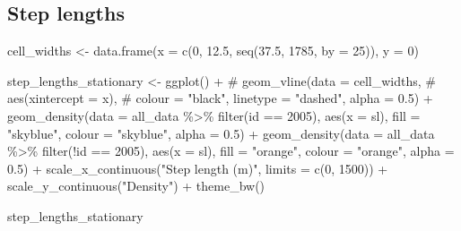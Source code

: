 \documentclass[
  letterpaper,
  DIV=11,
  numbers=noendperiod]{scrartcl}
\newenvironment{Shaded}{\begin{snugshade}}{\end{snugshade}}
\newcommand{\AttributeTok}[1]{\textcolor[rgb]{0.40,0.45,0.13}{#1}}
\newcommand{\CommentTok}[1]{\textcolor[rgb]{0.37,0.37,0.37}{#1}}
\newcommand{\DecValTok}[1]{\textcolor[rgb]{0.68,0.00,0.00}{#1}}
\newcommand{\FloatTok}[1]{\textcolor[rgb]{0.68,0.00,0.00}{#1}}
\newcommand{\FunctionTok}[1]{\textcolor[rgb]{0.28,0.35,0.67}{#1}}
\newcommand{\NormalTok}[1]{\textcolor[rgb]{0.00,0.23,0.31}{#1}}
\newcommand{\OtherTok}[1]{\textcolor[rgb]{0.00,0.23,0.31}{#1}}
\newcommand{\SpecialCharTok}[1]{\textcolor[rgb]{0.37,0.37,0.37}{#1}}
\newcommand{\StringTok}[1]{\textcolor[rgb]{0.13,0.47,0.30}{#1}}
\begin{document}
\subsection{Step lengths}\label{step-lengths}

\begin{Shaded}
\begin{Highlighting}[]
\NormalTok{cell\_widths }\OtherTok{\textless{}{-}} \FunctionTok{data.frame}\NormalTok{(}\AttributeTok{x =} \FunctionTok{c}\NormalTok{(}\DecValTok{0}\NormalTok{, }\FloatTok{12.5}\NormalTok{, }\FunctionTok{seq}\NormalTok{(}\FloatTok{37.5}\NormalTok{, }\DecValTok{1785}\NormalTok{, }\AttributeTok{by =} \DecValTok{25}\NormalTok{)), }\AttributeTok{y =} \DecValTok{0}\NormalTok{)}

\NormalTok{step\_lengths\_stationary }\OtherTok{\textless{}{-}} \FunctionTok{ggplot}\NormalTok{() }\SpecialCharTok{+}
  \CommentTok{\# geom\_vline(data = cell\_widths,}
  \CommentTok{\#            aes(xintercept = x), }
  \CommentTok{\#            colour = "black", linetype = "dashed", alpha = 0.5) +}
  \FunctionTok{geom\_density}\NormalTok{(}\AttributeTok{data =}\NormalTok{ all\_data }\SpecialCharTok{\%\textgreater{}\%} \FunctionTok{filter}\NormalTok{(id }\SpecialCharTok{==} \DecValTok{2005}\NormalTok{),}
                 \FunctionTok{aes}\NormalTok{(}\AttributeTok{x =}\NormalTok{ sl),}
                 \AttributeTok{fill =} \StringTok{"skyblue"}\NormalTok{, }\AttributeTok{colour =} \StringTok{"skyblue"}\NormalTok{, }\AttributeTok{alpha =} \FloatTok{0.5}\NormalTok{) }\SpecialCharTok{+}
  \FunctionTok{geom\_density}\NormalTok{(}\AttributeTok{data =}\NormalTok{ all\_data }\SpecialCharTok{\%\textgreater{}\%} \FunctionTok{filter}\NormalTok{(}\SpecialCharTok{!}\NormalTok{id }\SpecialCharTok{==} \DecValTok{2005}\NormalTok{),}
                 \FunctionTok{aes}\NormalTok{(}\AttributeTok{x =}\NormalTok{ sl),}
                 \AttributeTok{fill =} \StringTok{"orange"}\NormalTok{, }\AttributeTok{colour =} \StringTok{"orange"}\NormalTok{, }\AttributeTok{alpha =} \FloatTok{0.5}\NormalTok{) }\SpecialCharTok{+}
  \FunctionTok{scale\_x\_continuous}\NormalTok{(}\StringTok{"Step length (m)"}\NormalTok{, }\AttributeTok{limits =} \FunctionTok{c}\NormalTok{(}\DecValTok{0}\NormalTok{, }\DecValTok{1500}\NormalTok{)) }\SpecialCharTok{+}
  \FunctionTok{scale\_y\_continuous}\NormalTok{(}\StringTok{"Density"}\NormalTok{) }\SpecialCharTok{+}
  \FunctionTok{theme\_bw}\NormalTok{()}

\NormalTok{step\_lengths\_stationary}
\end{Highlighting}
\end{Shaded}
\end{document}
